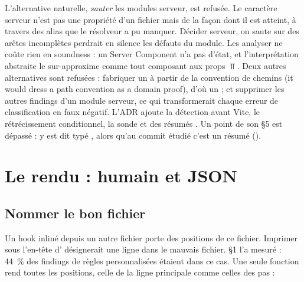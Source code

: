 \begin{decision}
L'alternative naturelle, \emph{sauter} les modules serveur, est refusée. Le caractère serveur n'est pas une propriété d'un fichier mais de la façon dont il est atteint, à travers des alias que le résolveur a pu manquer. Décider \og serveur, on saute\fg{} sur des arêtes incomplètes perdrait en silence les défauts du module. Les analyser ne coûte rien en soundness : un Server Component n'a pas d'état, et l'interprétation abstraite le sur-approxime comme tout composant aux props $\Top$. Deux autres alternatives sont refusées : fabriquer un  à partir de la convention de chemins (\og it would dress a path convention as a domain proof\fg{}), d'où un \Warning{} ; et supprimer les autres findings d'un module serveur, ce qui transformerait chaque erreur de classification en faux négatif. L'ADR ajoute la détection  avant Vite, le rétrécissement conditionnel, la sonde  et des résumés . Un point de son §5 est dépassé :  y est dit \og typé \fg{}, alors qu'au commit étudié c'est un résumé  ().
\end{decision}

\section{Le rendu : humain et JSON}
\label{sec:projet-cli-driver-rendu}

\subsection{Nommer le bon fichier}

Un hook inliné depuis un autre fichier porte des positions de ce fichier. Imprimer  sous l'en-tête d' désignerait une ligne dans le mauvais fichier.  §1 l'a mesuré : 44~\% des findings de règles personnalisées étaient dans ce cas. Une seule fonction rend toutes les positions, celle de la ligne principale comme celles des pas  :


